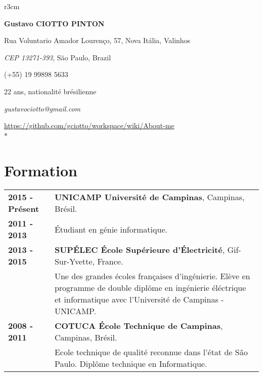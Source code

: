 \documentclass[10pt, a4paper]{article}
\author{Gustavo Ciotto Pinton}
\begin{document}
\pagestyle{empty} 

\begin{wrapfigure}{r}{3cm}
  \vspace{-20pt}
  \begin{center}
  \end{center}
\end{wrapfigure}

\textbf{\LARGE Gustavo CIOTTO PINTON}

Rua Voluntario Amador Lourenço, 57, Nova Itália, Valinhos

\textit{CEP 13271-393}, São Paulo, Brazil

(+55) 19 99898 5633

22 ans, nationalité brésilienne

\textit{gustavociotto@gmail.com} 

\url{https://github.com/gciotto/workspace/wiki/About-me}\\*



\section{Formation}

\begin{tabular}{p{} p{}}

 \textbf{2015 - Présent} & \textbf{UNICAMP Université de Campinas}, Campinas,
 Brésil.
 \\
 \textbf{2011 - 2013} & Étudiant en génie informatique. \vspace{8pt}\\

 \textbf{2013 - 2015} & \textbf{SUPÉLEC  École Supérieure d'Électricité},
 Gif-Sur-Yvette, France. \\
 & Une des grandes écoles françaises d'ingénierie. Elève en programme de double
 diplôme en ingénierie éléctrique et informatique avec l'Université de Campinas
 - UNICAMP. \vspace{8pt}
 \\
  
 
 \textbf{2008 - 2011} & \textbf{COTUCA École Technique de Campinas}, Campinas, Brésil. \\ 
 & Ecole technique de qualité reconnue dans l’état de São Paulo. Diplôme
 technique en Informatique. \\
\end{tabular}
\end{document}
